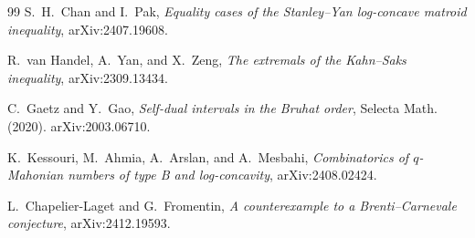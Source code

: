 \documentclass[11pt]{amsart}
\theoremstyle{plain}
\theoremstyle{definition}
\theoremstyle{remark}
\begin{document}
\begin{thebibliography}{99}
S.~H.~Chan and I.~Pak, \emph{Equality cases of the Stanley--Yan log-concave
matroid inequality}, arXiv:2407.19608.

R.~van Handel, A.~Yan, and X.~Zeng, \emph{The extremals of the Kahn--Saks
inequality}, arXiv:2309.13434.

C.~Gaetz and Y.~Gao, \emph{Self-dual intervals in the Bruhat order}, Selecta
Math. (2020). arXiv:2003.06710.

K.~Kessouri, M.~Ahmia, A.~Arslan, and A.~Mesbahi, \emph{Combinatorics of
$q$-Mahonian numbers of type B and log-concavity}, arXiv:2408.02424.

L.~Chapelier-Laget and G.~Fromentin, \emph{A counterexample to a
Brenti--Carnevale conjecture}, arXiv:2412.19593.

\end{thebibliography}
\end{document}
